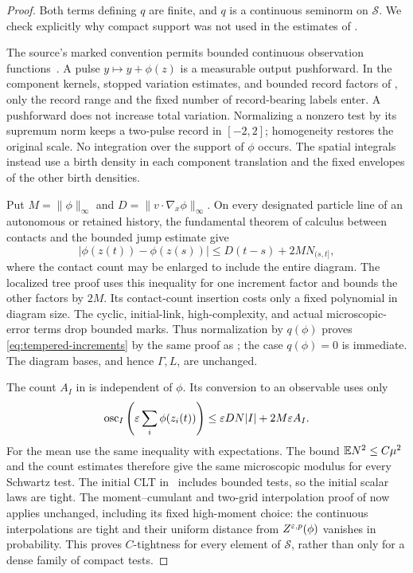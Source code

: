 \begin{proof}
Both terms defining $q$ are finite, and $q$ is a continuous seminorm
on $\mathcal S$. We check explicitly why compact support was not
used in the estimates of .

The source's marked convention permits bounded continuous observation
functions~\cite[\S6, Conventions and the assertion]{U}.
A pulse $y\mapsto y+\phi(z)$ is a measurable output pushforward.
In the component kernels, stopped variation estimates, and bounded
record factors of , only the record range and
the fixed number of record-bearing labels enter. A pushforward does
not increase total variation. Normalizing a nonzero test by its
supremum norm keeps a two-pulse record in $[-2,2]$; homogeneity restores
the original scale. No integration over the support of $\phi$ occurs.
The spatial integrals instead use a birth density in each component
translation and the fixed envelopes of the other birth densities.

Put $M=\|\phi\|_\infty$ and $D=\|v\cdot\nabla_x\phi\|_\infty$.
On every designated particle line of an autonomous or retained history,
the fundamental theorem of calculus between contacts and the bounded
jump estimate give
\[
 |\phi(z(t))-\phi(z(s))|
       \leq D(t-s)+2M N_{(s,t]},
\]
where the contact count may be enlarged to include the entire diagram.
The localized tree proof uses this inequality for one increment factor
and bounds the other factors by $2M$. Its contact-count insertion costs
only a fixed polynomial in diagram size. The cyclic, initial-link,
high-complexity, and actual microscopic-error terms drop bounded marks.
Thus normalization by $q(\phi)$ proves
\eqref{eq:tempered-increments} by the same proof as
; the case $q(\phi)=0$ is immediate.
The diagram bases, and hence $\Gamma,L$, are unchanged.

The count $A_I$ in  is independent of $\phi$.
Its conversion to an observable uses only
\[
 \operatorname{osc}_I\left(\varepsilon\sum_i\phi(z_i(t))\right)
       \leq \varepsilon DN|I|+2M\varepsilon A_I.
\]
For the mean use the same inequality with expectations. The bound
$\mathbb E N^2\leq C\mu^2$ and the count estimates therefore give the same
microscopic modulus for every Schwartz test.
The initial CLT in~\cite[\S2, Initial ensemble]{U} includes bounded
tests, so the initial scalar laws are tight.
The moment--cumulant and two-grid interpolation proof of
 now applies unchanged, including its fixed
high-moment choice: the continuous interpolations are tight and their
uniform distance from $Z^{\varepsilon,p}(\phi)$ vanishes in probability.
This proves $C$-tightness for every element of $\mathcal S$, rather
than only for a dense family of compact tests.
\end{proof}

